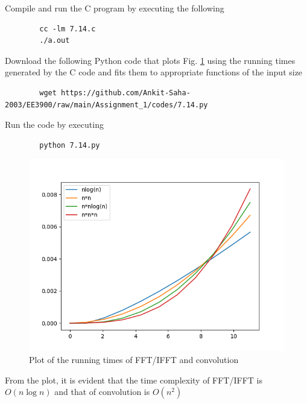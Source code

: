 \documentclass[journal,12pt,twocolumn]{IEEEtran}
\numberwithin{equation}{section}
\renewcommand\thesection{\arabic{section}}
\renewcommand\thesection{\arabic{section}}
\begin{document}
\begin{enumerate}[label=\arabic*.,ref=\thesection.\theenumi]
	Compile and run the C program by executing the following
	\begin{lstlisting}
		cc -lm 7.14.c
		./a.out
	\end{lstlisting}
	
	Download the following Python code that plots Fig. \ref{fig-7.14} using the running times generated by the C code and fits them to appropriate functions of the input size
	\begin{lstlisting}
		wget https://github.com/Ankit-Saha-2003/EE3900/raw/main/Assignment_1/codes/7.14.py
	\end{lstlisting}
	
	Run the code by executing
	\begin{lstlisting}
		python 7.14.py
	\end{lstlisting}

	\begin{figure}[!ht]
		\centering
		\includegraphics[width=\columnwidth]{figs/7.14.png}
		\caption{Plot of the running times of FFT/IFFT and convolution}
		\label{fig-7.14}	
	\end{figure}
	
	From the plot, it is evident that the time complexity of FFT/IFFT is $O(n \log n)$ and that of convolution is $O(n^2)$
	
	
	\end{enumerate}
\end{document}
